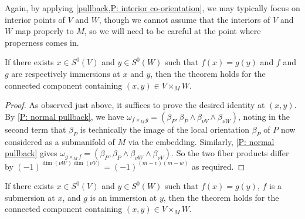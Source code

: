 Again, by applying \cref{pullback,P: interior co-orientation}, we may typically focus on interior points of $V$ and $W$, though we cannot assume that the interiors of $V$ and $W$ map properly to $M$, so we will need to be careful at the point where properness comes in.

\begin{lemma}\label{L: im/im}
	If there exists $x \in S^0(V)$ and $y \in S^0(W)$ such that $f(x) = g(y)$ and $f$ and $g$ are respectively immersions at $x$ and $y$, then the theorem holds for the connected component containing $(x,y) \in V \times_M W$.
\end{lemma}

\begin{proof}
	As observed just above, it suffices to prove the desired identity at $(x,y)$.
	By \cref{P: normal pullback}, we have $\omega_{f \times_M g} = (\beta_P, \beta_P \wedge \beta_{\nu V} \wedge \beta_{\nu W})$, noting in the second term that $\beta_P$ is technically the image of the local orientation $\beta_P$ of $P$ now considered as a submanifold of $M$ via the embedding.
	Similarly, \cref{P: normal pullback} gives
	$\omega_{g \times_M f} = (\beta_P,\beta_P \wedge \beta_{\nu W} \wedge \beta_{\nu V})$.
	So the two fiber products differ by $(-1)^{\dim(\nu W)\dim(\nu V)} = (-1)^{(m-v)(m-w)}$ as required.
\end{proof}

\begin{lemma}\label{L: im/sub}
	If there exists $x \in S^0(V)$ and $y \in S^0(W)$ such that $f(x) = g(y)$, $f$ is a submersion at $x$, and $g$ is an immersion at $y$, then the theorem holds for the connected component containing $(x,y) \in V \times_M W$.
\end{lemma}

